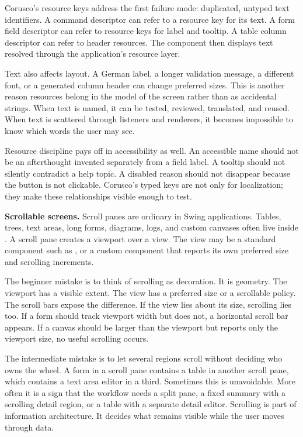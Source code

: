 Corusco's resource keys address the first failure mode: duplicated, untyped text identifiers. A command descriptor can refer to a resource key for its text. A form field descriptor can refer to resource keys for label and tooltip. A table column descriptor can refer to header resources. The component then displays text resolved through the application's resource layer.

Text also affects layout. A German label, a longer validation message, a different font, or a generated column header can change preferred sizes. This is another reason resources belong in the model of the screen rather than as accidental strings. When text is named, it can be tested, reviewed, translated, and reused. When text is scattered through listeners and renderers, it becomes impossible to know which words the user may see.

Resource discipline pays off in accessibility as well. An accessible name should not be an afterthought invented separately from a field label. A tooltip should not silently contradict a help topic. A disabled reason should not disappear because the button is not clickable. Corusco's typed keys are not only for localization; they make these relationships visible enough to test.

\textbf{Scrollable screens.} Scroll panes are ordinary in Swing applications. Tables, trees, text areas, long forms, diagrams, logs, and custom canvases often live inside . A scroll pane creates a viewport over a view. The view may be a standard component such as , or a custom component that reports its own preferred size and scrolling increments.

The beginner mistake is to think of scrolling as decoration. It is geometry. The viewport has a visible extent. The view has a preferred size or a scrollable policy. The scroll bars expose the difference. If the view lies about its size, scrolling lies too. If a form should track viewport width but does not, a horizontal scroll bar appears. If a canvas should be larger than the viewport but reports only the viewport size, no useful scrolling occurs.

The intermediate mistake is to let several regions scroll without deciding who owns the wheel. A form in a scroll pane contains a table in another scroll pane, which contains a text area editor in a third. Sometimes this is unavoidable. More often it is a sign that the workflow needs a split pane, a fixed summary with a scrolling detail region, or a table with a separate detail editor. Scrolling is part of information architecture. It decides what remains visible while the user moves through data.

